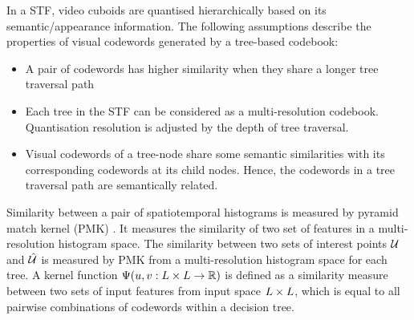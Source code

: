 In a STF, video cuboids are quantised hierarchically based on its semantic/appearance information. The following assumptions describe the properties of visual codewords generated by a tree-based codebook:
\begin{itemize}
	\item A pair of codewords has higher similarity when they share a longer tree traversal path
	\item Each tree in the STF can be considered as a multi-resolution codebook. Quantisation resolution is adjusted by the depth of tree traversal.
	\item Visual codewords of a tree-node share some semantic similarities with its corresponding codewords at its child nodes. Hence, the codewords in a tree traversal path are semantically related. 
\end{itemize} 

Similarity between a pair of spatiotemporal histograms is measured by pyramid match kernel (PMK) \cite{Grauman2005}. It measures the similarity of two set of features in a multi-resolution histogram space.
The similarity between two sets of interest points $\mathcal{U}$ and $\mathcal{\hat{U}}$ is measured by PMK from a multi-resolution histogram space for each tree. 
A kernel function $\Psi(u,v: L \times L \rightarrow \mathbb{R})$ is defined as a similarity measure between two sets of input features from input space $L \times L$, which is equal to all pairwise combinations of codewords within a decision tree.  

